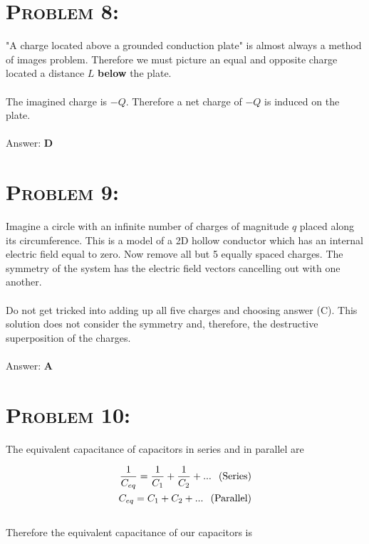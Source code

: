 \documentclass{article}
\begin{document}

\section{\textsc{Problem 8:}} "A charge located above a grounded conduction plate" is almost always a method of images problem. Therefore we must picture an equal and opposite charge located a distance $L$ \textbf{below} the plate.
\\
\\
The imagined charge is $-Q$. Therefore a net charge of $-Q$ is induced on the plate.
\\\\
Answer: \textbf{\textcolor{ProcessBlue}D}\\


\section{\textsc{Problem 9:}} Imagine a circle with an infinite number of charges of magnitude $q$ placed along its circumference. This is a model of a 2D hollow conductor which has an internal electric field equal to zero. Now remove all but 5 equally spaced charges. The symmetry of the system has the electric field vectors cancelling out with one another. \\
\\
Do not get tricked into adding up all five charges and choosing answer (C). This solution does not consider the symmetry and, therefore, the destructive superposition of the charges.
\\\\
Answer: \textbf{\textcolor{ProcessBlue}A}\\


\section{\textsc{Problem 10:}} The equivalent capacitance of capacitors in series and in parallel are

\begin{align}
\frac{1}{C_{eq}} = \frac{1}{C_{1}} + \frac{1}{C_{2}} + ... \hspace{.1in} \text{(Series)}\\
C_{eq} = C_{1} + C_{2} + ... \hspace{.1in} \text{(Parallel)}
\end{align}
\\
Therefore the equivalent capacitance of our capacitors is
\end{document}
